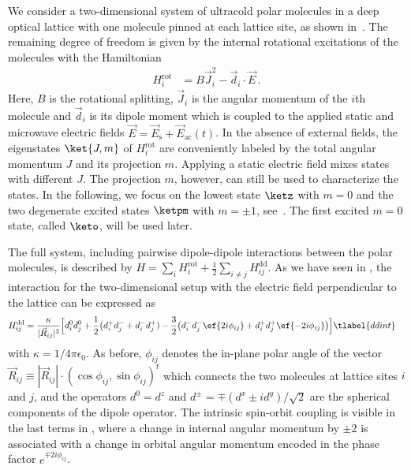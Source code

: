 We consider a two-dimensional system of ultracold polar molecules in a deep optical lattice with one molecule pinned at each lattice site, as shown in~.
The remaining degree of freedom is given by the internal rotational excitations of the molecules with the Hamiltonian
\begin{align}
    H^{\text{rot}}_i &= B \vec{J}_i^2 - \vec{d}_i\cdot\vec{E}\,.
\end{align}
Here, $B$ is the rotational splitting, $\vec{J}_i$ is the angular momentum of the $i$th molecule and $\vec{d}_i$ is its dipole moment which is coupled to the applied static and microwave electric fields $\vec{E} = \vec{E}_{\text{s}} + \vec{E}_{\text{ac}}(t)$.
In the absence of external fields, the eigenstates $\ket{J,m}$ of $H^{\text{rot}}_{i}$ are conveniently labeled by the total angular momentum $J$ and its projection $m$.
Applying a static electric field mixes states with different $J$.
The projection $m$, however, can still be used to characterize the states.
In the following, we focus on the lowest state $\ketz$ with $m=0$ and the two degenerate excited states $\ketpm$ with $m = \pm 1$, see~.
The first excited $m=0$ state, called $\keto$, will be used later.

The full system, including pairwise dipole-dipole interactions between the polar mole\-cules, is described by $H=\sum_i H^{\text{rot}}_i + \frac{1}{2}\sum_{i\ne j}H^{\text{dd}}_{ij}$.
As we have seen in , the interaction for the two-dimensional setup with the electric field perpendicular to the lattice can be expressed as
\begin{align}
    H^{\text{dd}}_{ij}=\frac{\kappa}{|\vec{R}_{ij}|^3} &\Big[d^0_i d^0_j + \frac{1}{2}\big(d^+_i d^-_j + d^-_i d^+_j) - \frac{3}{2}\big(d^-_i d^-_j \ef{2i\phi_{ij}} + d^+_i d^+_j \ef{-2i\phi_{ij}}\big)\Big] \tlabel{ddint}
\end{align}
with $\kappa=1/4\pi\epsilon_0$.
As before, $\phi_{ij}$ denotes the in-plane polar angle of the vector $\vec{R}_{ij} \equiv |\vec{R}_{ij}| \cdot (\cos \phi_{ij}, \sin \phi_{ij})^t$ which connects the two molecules at lattice sites $i$ and $j$, and the operators $d^0=d^z$ and $d^\pm=\mp (d^x\pm i d^y)/\sqrt{2}$ are the spherical components of the dipole operator.
The intrinsic spin-orbit coupling is visible in the last terms in , where a change in internal angular momentum by $\pm 2$ is associated with a change in orbital angular momentum encoded in the phase factor $e^{\mp 2i \phi_{ij}}$.


